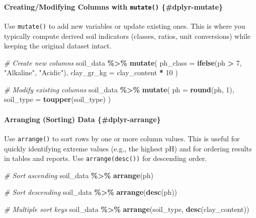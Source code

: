 \documentclass[
  10pt,
  b5paper,
  oneside]{book}
\newenvironment{Shaded}{\begin{snugshade}}{\end{snugshade}}
\newcommand{\AttributeTok}[1]{\textcolor[rgb]{0.13,0.29,0.53}{#1}}
\newcommand{\CommentTok}[1]{\textcolor[rgb]{0.56,0.35,0.01}{\textit{#1}}}
\newcommand{\DecValTok}[1]{\textcolor[rgb]{0.00,0.00,0.81}{#1}}
\newcommand{\FunctionTok}[1]{\textcolor[rgb]{0.13,0.29,0.53}{\textbf{#1}}}
\newcommand{\NormalTok}[1]{#1}
\newcommand{\SpecialCharTok}[1]{\textcolor[rgb]{0.81,0.36,0.00}{\textbf{#1}}}
\newcommand{\StringTok}[1]{\textcolor[rgb]{0.31,0.60,0.02}{#1}}
\begin{document}
\paragraph*{\texorpdfstring{Creating/Modifying Columns with \texttt{mutate()} \{\#dplyr-mutate\}}{Creating/Modifying Columns with mutate() \{\#dplyr-mutate\}}}\label{creatingmodifying-columns-with-mutate-dplyr-mutate}

Use \texttt{mutate()} to add new variables or update existing ones. This is where you typically compute derived soil indicators (classes, ratios, unit conversions) while keeping the original dataset intact.

\begin{Shaded}
\begin{Highlighting}[]
\CommentTok{\# Create new columns}
\NormalTok{soil\_data }\SpecialCharTok{\%\textgreater{}\%}
  \FunctionTok{mutate}\NormalTok{(}
    \AttributeTok{ph\_class =} \FunctionTok{ifelse}\NormalTok{(ph }\SpecialCharTok{\textgreater{}} \DecValTok{7}\NormalTok{, }\StringTok{"Alkaline"}\NormalTok{, }\StringTok{"Acidic"}\NormalTok{),}
    \AttributeTok{clay\_gr\_kg =}\NormalTok{ clay\_content }\SpecialCharTok{*} \DecValTok{10}
\NormalTok{  )}

\CommentTok{\# Modify existing columns}
\NormalTok{soil\_data }\SpecialCharTok{\%\textgreater{}\%}
  \FunctionTok{mutate}\NormalTok{(}
    \AttributeTok{ph =} \FunctionTok{round}\NormalTok{(ph, }\DecValTok{1}\NormalTok{),}
    \AttributeTok{soil\_type =} \FunctionTok{toupper}\NormalTok{(soil\_type)}
\NormalTok{  )}
\end{Highlighting}
\end{Shaded}

\paragraph*{Arranging (Sorting) Data \{\#dplyr-arrange\}}\label{arranging-sorting-data-dplyr-arrange}

Use \texttt{arrange()} to sort rows by one or more column values. This is useful for quickly identifying extreme values (e.g., the highest pH) and for ordering results in tables and reports.
Use \texttt{arrange(desc())} for descending order.

\begin{Shaded}
\begin{Highlighting}[]
\CommentTok{\# Sort ascending}
\NormalTok{soil\_data }\SpecialCharTok{\%\textgreater{}\%}
  \FunctionTok{arrange}\NormalTok{(ph)}

\CommentTok{\# Sort descending}
\NormalTok{soil\_data }\SpecialCharTok{\%\textgreater{}\%}
  \FunctionTok{arrange}\NormalTok{(}\FunctionTok{desc}\NormalTok{(ph))}

\CommentTok{\# Multiple sort keys}
\NormalTok{soil\_data }\SpecialCharTok{\%\textgreater{}\%}
  \FunctionTok{arrange}\NormalTok{(soil\_type, }\FunctionTok{desc}\NormalTok{(clay\_content))}
\end{Highlighting}
\end{Shaded}
\end{document}
